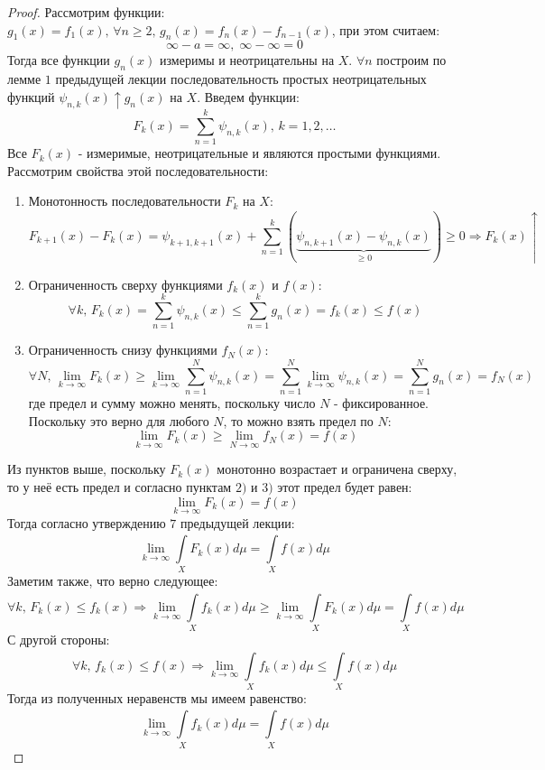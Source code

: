 \documentclass[12pt]{article}
\theoremstyle{definition}
\newcommand{\ddsum}[2]{\displaystyle\sum\limits_{#1}^{#2}}
\newcommand{\ddint}[2]{\displaystyle\int\limits_{#1}^{#2}}
\begin{document}
\begin{proof}
	Рассмотрим функции: $g_1(x) = f_1(x), \, \forall n \geq 2, \, g_n(x) = f_n(x) - f_{n-1}(x)$, при этом считаем:
	$$
		\infty - a = \infty, \; \infty - \infty = 0
	$$
	Тогда все функции $g_n(x)$ измеримы и неотрицательны на $X$. $\forall n$ построим по лемме $1$ предыдущей лекции последовательность простых неотрицательных функций $\psi_{n,k}(x) \uparrow g_n(x)$ на $X$. Введем функции: 
	$$
		F_k(x) = \ddsum{n = 1}{k}\psi_{n,k}(x), \, k = 1,2,\dotsc
	$$
	Все $F_k(x)$ - измеримые, неотрицательные и являются простыми функциями. Рассмотрим свойства этой последовательности:
	\begin{enumerate}[label=\arabic*)]
		\item Монотонность последовательности $F_k$ на $X$: 
		$$
			F_{k+1}(x) - F_k(x) = \psi_{k+1,k+1}(x) + \ddsum{n = 1}{k}(\underbrace{\psi_{n,k+1}(x) - \psi_{n,k}(x)}_{\geq 0}) \geq 0 \Rightarrow F_k(x) \uparrow
		$$
		\item Ограниченность сверху функциями $f_k(x)$ и $f(x)$:
		$$
			\forall k, \, F_k(x) = \ddsum{n = 1}{k}\psi_{n,k}(x) \leq \ddsum{n = 1}{k}g_n(x) = f_k(x)\leq f(x)
		$$
		\item Ограниченность снизу функциями $f_N(x)$:
		$$
			\forall N, \, \lim\limits_{k \to \infty}F_k(x) \geq \lim\limits_{k \to \infty}\ddsum{n = 1}{N}\psi_{n,k}(x) = \ddsum{n = 1}{N}\lim\limits_{k \to \infty}\psi_{n,k}(x) = \ddsum{n = 1}{N}g_n(x) = f_N(x)
		$$
		где предел и сумму можно менять, поскольку число $N$ - фиксированное. Поскольку это верно для любого $N$, то можно взять предел по $N$:
		$$
			\lim\limits_{k \to \infty}F_k(x) \geq \lim\limits_{N\to \infty}f_N(x) = f(x)
		$$
	\end{enumerate}
	Из пунктов выше, поскольку $F_k(x)$ монотонно возрастает и ограничена сверху, то у неё есть предел и согласно пунктам $2)$ и $3)$ этот предел будет равен:
	$$
		\lim\limits_{k \to \infty}F_k(x) = f(x) 
	$$
	Тогда согласно утверждению $7$ предыдущей лекции:
	$$
		\lim\limits_{k \to \infty}\ddint{X}{}F_k(x)d\mu = \ddint{X}{}f(x)d\mu
	$$
	Заметим также, что верно следующее:
	$$
		\forall k, \, F_k(x) \leq f_k(x) \Rightarrow \lim\limits_{k \to \infty}\ddint{X}{}f_k(x)d\mu \geq \lim\limits_{k \to \infty}\ddint{X}{}F_k(x)d\mu = \ddint{X}{}f(x)d\mu
	$$
	С другой стороны:
	$$
		\forall k, \, f_k(x) \leq f(x) \Rightarrow \lim\limits_{k \to \infty}\ddint{X}{}f_k(x)d\mu \leq \ddint{X}{}f(x)d\mu
	$$
	Тогда из полученных неравенств мы имеем равенство:
	$$
		\lim\limits_{k \to \infty}\ddint{X}{}f_k(x)d\mu = \ddint{X}{}f(x)d\mu
	$$
\end{proof}
\end{document}
